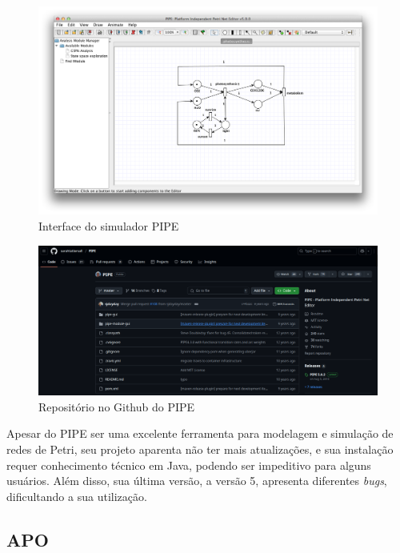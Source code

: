 \documentclass[
	12pt,				%
	openright,			%
	oneside,			%
	a4paper,			%
	english,			%
	brazil				%
	]{abntex2}
\theoremstyle{doispontos}
\begin{document}
\begin{figure}[ht] 
	\centering
	\includegraphics[scale=0.30]{figuras/pipe.png}
	\caption[Interface do simulador PIPE]{Interface do simulador PIPE}
	\label{fig:interfacePipe}
\end{figure}
\FloatBarrier

\begin{figure}[ht] 
	\centering
	\includegraphics[scale=0.30]{figuras/pipeRepo.png}
	\caption[Repositório no Github do PIPE]{Repositório no Github do PIPE}
	\label{fig:pipeRepo}
\end{figure}
\FloatBarrier

Apesar do PIPE ser uma excelente ferramenta para modelagem e simulação de redes de Petri, seu projeto aparenta não ter mais atualizações, e sua instalação requer conhecimento técnico em Java, podendo ser impeditivo para alguns usuários. Além disso, sua última versão, a versão 5, apresenta diferentes \textit{bugs}, dificultando a sua utilização. 

\subsection{APO}
\end{document}
